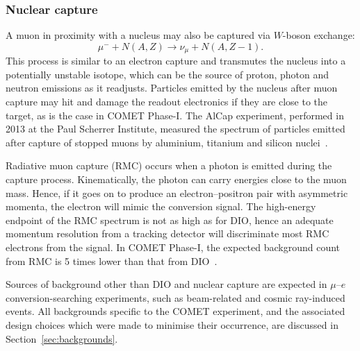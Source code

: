 \subsubsection{Nuclear capture}
A muon in proximity with a nucleus may also be captured via $W$-boson exchange:
\begin{equation*}\label{eq:capture}
    \mu^- + N(A, Z) \rightarrow \nu_\mu + N(A, Z-1).
\end{equation*}
This process is similar to an electron capture and transmutes the nucleus into a
potentially unstable isotope, which can be the source of proton, photon and
neutron emissions as it readjusts. Particles emitted by the nucleus after muon
capture may hit and damage the readout electronics if they are close to the
target, as is the case in COMET Phase-I. The AlCap experiment, performed in 2013
at the Paul Scherrer Institute, measured the spectrum of particles emitted after
capture of stopped muons by aluminium, titanium and silicon
nuclei~\cite{PhysRevC.105.035501}.


Radiative muon capture (RMC) occurs when a photon is emitted during the capture
process. Kinematically, the photon can carry energies close to the muon mass.
Hence, if it goes on to produce an electron--positron pair with asymmetric
momenta, the electron will mimic the conversion signal. The high-energy endpoint
of the RMC spectrum is not as high as for DIO, hence an adequate momentum
resolution from a tracking detector will discriminate most RMC electrons from
the signal. In COMET Phase-I, the expected background count from RMC is 5 times
lower than that from DIO~\cite{the_comet_collaboration_comet_2020}.




Sources of background other than DIO and nuclear capture are expected in
$\mu$--$e$ conversion-searching experiments, such as beam-related and cosmic
ray-induced events. All backgrounds specific to the COMET experiment, and the
associated design choices which were made to minimise their occurrence, are
discussed in Section~\ref{sec:backgrounds}.






